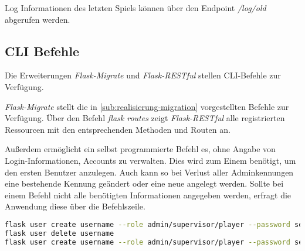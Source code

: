 Log Informationen des letzten Spiels können über den Endpoint \textit{/log/old} abgerufen werden.
	
\subsection{CLI Befehle}
Die Erweiterungen \textit{Flask-Migrate} und \textit{Flask-RESTful} stellen CLI-Befehle zur Verfügung. 


\textit{Flask-Migrate} stellt die in \autoref{sub:realisierung-migration} vorgestellten Befehle zur Verfügung. Über den Befehl \textit{flask routes} zeigt \textit{Flask-RESTful} alle registrierten Ressourcen mit den entsprechenden Methoden und Routen an.

Außerdem ermöglicht ein selbst programmierte Befehl es, ohne Angabe von Login-Informationen, Accounts zu verwalten. Dies wird zum Einem benötigt, um den ersten Benutzer anzulegen. Auch kann so bei Verlust aller Adminkennungen eine bestehende Kennung geändert oder eine neue angelegt werden. Sollte bei einem Befehl nicht alle benötigten Informationen angegeben werden, erfragt die Anwendung diese über die Befehlszeile.

\begin{lstlisting}[language=bash, frame=single, caption={GIS CLI}, captionpos=b, label={lst:gis-cli}]
flask user create username --role admin/supervisor/player --password secure_pw
flask user delete username
flask user create username --role admin/supervisor/player --password secure_pw
\end{lstlisting}